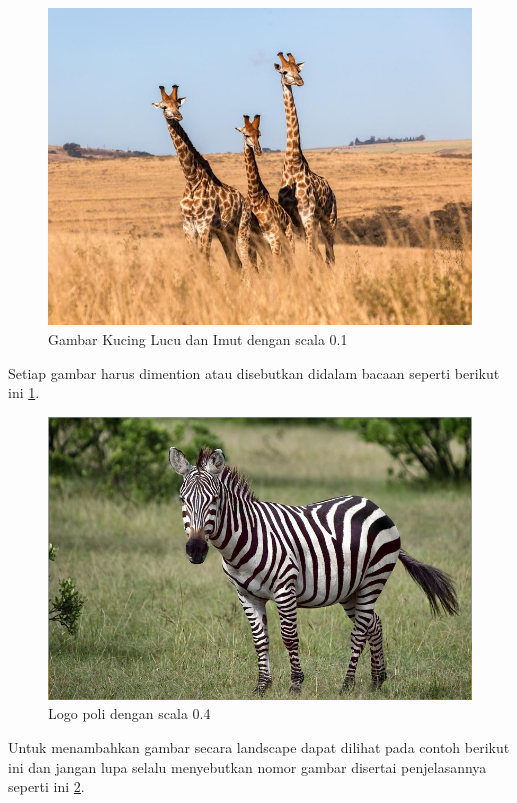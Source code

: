 \begin{figure}[H]
    \centering
    \includegraphics[scale=0.1]{Gambar/jerapahh.jpeg}
    \caption{Gambar Kucing Lucu dan Imut dengan scala 0.1}
    \label{fig:kucing}
\end{figure}

Setiap gambar harus dimention atau disebutkan didalam bacaan seperti berikut ini \cref{fig:kucing}.

\begin{figure}[H]
    \centering
    \includegraphics[scale=0.4]{Gambar/zebra.jpg}
    \caption{Logo poli dengan scala 0.4}
    \label{fig:logopoli}
\end{figure}

Untuk menambahkan gambar secara landscape dapat dilihat pada contoh berikut ini dan jangan lupa selalu menyebutkan nomor gambar disertai penjelasannya seperti ini \cref{fig:logopoli}.

